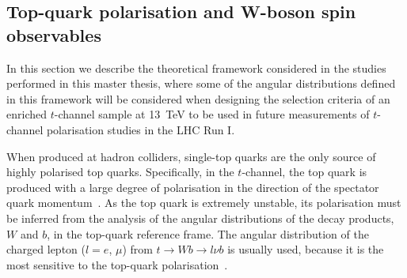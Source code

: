 


\subsection{Top-quark polarisation and W-boson spin observables}\label{subsec:polobs}

In this section we describe the theoretical framework considered in the studies performed in this master thesis, where some of the angular distributions defined in this framework will be considered when designing the selection criteria of an enriched $t$-channel sample at 13~TeV to be used in future measurements of $t$-channel polarisation studies in the LHC Run I.

When produced at hadron colliders, single-top quarks are the only source
of highly polarised top quarks. Specifically, in the $t$-channel, the top quark is produced with a large degree of polarisation in the direction of the spectator quark momentum~\cite{Komm:2014fca}. As the top quark is  extremely unstable, its polarisation must be inferred from the analysis of the angular distributions of the decay products, $W$ and $b$, in the top-quark reference frame. The angular distribution of the charged lepton ($l= e$, $\mu$) from $t \rightarrow Wb \rightarrow l\nu b$ is usually used, because it is the most sensitive to the top-quark polarisation~\cite{CMS:2013rfa}. %




